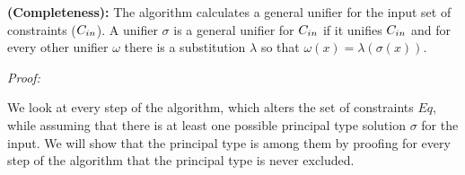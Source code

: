 \begin{theorem}\label{theo:unifyCompleteness}
  \textbf{(Completeness):} The \unify{} algorithm calculates a general unifier for the input set of constraints ($C_{in}$).
  A unifier $\sigma$ is a general unifier for $C_{in}$ if it unifies $C_{in}$
  and for every other unifier $\omega$ there is a substitution $\lambda$ so that $\omega(x) = \lambda(\sigma(x))$.
\end{theorem}
\textit{Proof:}

We look at every step of the algorithm, which alters the set of constraints $Eq$,
while assuming that there is at least one possible principal type solution $\sigma$ for the input.
We will show that the principal type is among them by proofing for every step of the algorithm that the principal type is never excluded.


